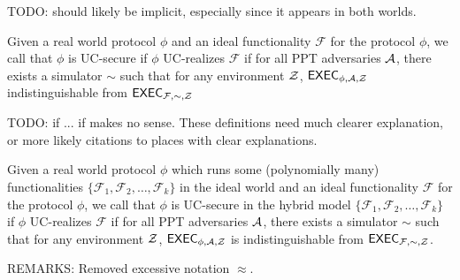 TODO: \secparam should likely be implicit, especially since it appears in both worlds.

\begin{definition} \label{def:uc}
Given a real world protocol $ \phi $ and an ideal functionality $ \mathcal{F} $ for the protocol $ \phi $, we call that $ \phi $ is UC-secure if $ \phi $ UC-realizes $ \mathcal{F} $ if for all PPT adversaries $ \mathcal{A} $, there exists a simulator $ \sim  $ such that for any environment $ \mathcal{Z} $,
 $\mathsf{EXEC}_{\phi, \mathcal{A}, \mathcal{Z}}$ indistinguishable from $\mathsf{EXEC}_{\mathcal{F},\sim, \mathcal{Z}}$
\end{definition}

TODO: if ... if makes no sense.  These definitions need much clearer explanation, or more likely citations to places with clear explanations. 

\begin{definition}
Given a real world protocol $ \phi $ which runs some (polynomially many) functionalities $ \{\mathcal{F}_1, \mathcal{F}_2, \ldots, \mathcal{F}_k\} $ in the ideal world and an ideal functionality $ \mathcal{F} $ for the protocol $ \phi $, we call that $ \phi $ is UC-secure in the hybrid model $ \{\mathcal{F}_1, \mathcal{F}_2, \ldots, \mathcal{F}_k\} $ if $ \phi $ UC-realizes $ \mathcal{F} $ if for all PPT adversaries $ \mathcal{A} $, there exists a simulator $ \sim  $ such that for any environment $ \mathcal{Z} $,
 $\mathsf{EXEC}_{\phi, \mathcal{A}, \mathcal{Z}}$ is indistinguishable from $\mathsf{EXEC}_{\mathcal{F},\sim, \mathcal{Z}}$.
\end{definition}

REMARKS:  Removed excessive notation $\approx$.














\endinput



BROKEN BOLOW THIS




We fix $J \in \ecJ$ as a generator for public keys.  Any $\KeyGen$ algorithm randomly samples a secret keys $\sk \in \F_q$ and then computes its associate public keys $\pk = \sk J$.  We shall not discuss infrastructure that authorizes public keys.  Yet although our results do not require proof-of-knowledge on $\pk$ per se, we still strongly recommend that back certifications accompany any certificates that authorize $\pk$.

\smallskip




